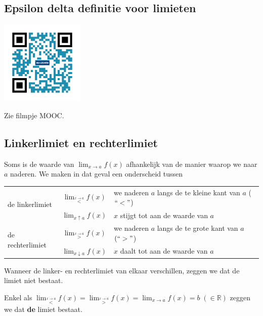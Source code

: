 \subsection{Epsilon delta definitie voor limieten}
\begin{minipage}{.25\linewidth}
	\raggedright
	\includegraphics[width=4cm]{2_elem_rekenvaardigheden_B/inputs/QR_Code_EPSILONDELTA_module2}
\end{minipage}
\begin{minipage}{.7\linewidth}
	Zie filmpje MOOC.
\end{minipage}

\subsection{Linkerlimiet en rechterlimiet}

Soms is de waarde van $\lim_{x\to a}f(x)$ afhankelijk
van de manier waarop we naar $a$ naderen. We maken in dat geval een
onderscheid tussen


\begin{center}
	\begin{tabular}{lcl}
	\multirow{2}{*}{de linkerlimiet} & $\lim_{\overset{x\rightarrow a}{<}}f(x)$ & we naderen $a$ langs de te kleine kant van $a$ ($\lyxmathsym{\textquotedblleft}<\lyxmathsym{\textquotedblright}$)\\
	& $\lim_{x\uparrow a}f(x)$ & $x$ stijgt tot aan de waarde van $a$\\
	\multirow{2}{*}{de rechterlimiet} & $\lim_{\overset{x\rightarrow a}{>}}f(x)$ & we naderen $a$ langs de te grote kant van $a$ $(\lyxmathsym{\textquotedblleft}>\lyxmathsym{\textquotedblright}$)\\
	& $\lim_{x\downarrow a}f(x)$ & $x$ daalt tot aan de waarde van $a$\\
\end{tabular}
\end{center}

Wanneer de linker- en rechterlimiet van elkaar verschillen,
zeggen we dat de limiet niet bestaat. 

Enkel als $\lim_{\overset{x\rightarrow a}{<}}f(x)=\lim_{\overset{x\rightarrow a}{>}}f(x)=\lim_{x\to a}f(x)=b\;(\in\mathbb{R})$
zeggen we dat \textbf{de} limiet bestaat.

